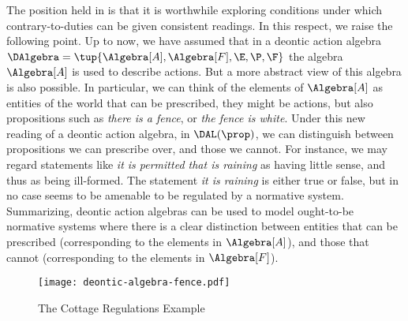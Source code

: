 The position held in \cite{Prakken:1996} is that it is worthwhile exploring conditions under which contrary-to-duties can be given consistent readings.
In this respect, we raise the following point.
Up to now, we have assumed that in a deontic action algebra $\DAlgebra = \tup{\Algebra[A], \Algebra[F], \E, \P, \F}$ the algebra $\Algebra[A]$ is used to describe actions.
But a more abstract view of this algebra is also possible.
In particular, we can think of the elements of  $\Algebra[A]$ as entities of the world that can be prescribed, they might be actions, but also propositions such as \emph{there is a fence}, or \emph{the fence is white}.
Under this new reading of a deontic action algebra, in $\DAL(\prop)$, we can distinguish between propositions we can prescribe over, and those we cannot.
For instance, we may regard statements like \emph{it is permitted that is raining} as having little sense, and thus as being ill-formed.
The statement \emph{it is raining} is either true or false, but in no case seems to be amenable to be regulated by a normative system.
Summarizing, deontic action algebras can be used to model ought-to-be normative systems where there is a clear distinction between entities that can be prescribed (corresponding to the elements in $\Algebra[A]$), and those that cannot (corresponding to the elements in $\Algebra[F]$).

\begin{figure}
	\centering
	\texttt{[image: deontic-algebra-fence.pdf]}\\[1em]
	\caption{The Cottage Regulations Example}\label{ex:fence}
\end{figure}

